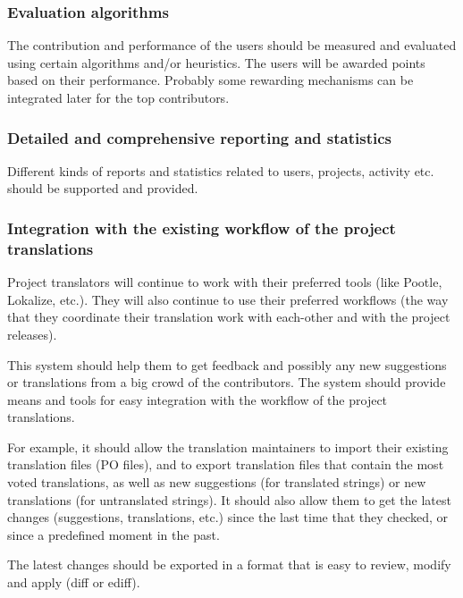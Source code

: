\documentclass[11pt]{article}
\begin{document}
\subsubsection{Evaluation algorithms}
\label{sec-3.1.5}


    The contribution and performance of the users should be measured
    and evaluated using certain algorithms and/or heuristics. The
    users will be awarded points based on their performance. Probably
    some rewarding mechanisms can be integrated later for the top
    contributors.

\subsubsection{Detailed and comprehensive reporting and statistics}
\label{sec-3.1.6}


    Different kinds of reports and statistics related to users,
    projects, activity etc. should be supported and provided.

\subsubsection{Integration with the existing workflow of the project translations}
\label{sec-3.1.7}


    Project translators will continue to work with their preferred
    tools (like Pootle, Lokalize, etc.). They will also continue to
    use their preferred workflows (the way that they coordinate their
    translation work with each-other and with the project releases).

    This system should help them to get feedback and possibly any new
    suggestions or translations from a big crowd of the
    contributors. The system should provide means and tools for easy
    integration with the workflow of the project translations.

    For example, it should allow the translation maintainers to import
    their existing translation files (PO files), and to export
    translation files that contain the most voted translations, as
    well as new suggestions (for translated strings) or new
    translations (for untranslated strings). It should also allow them
    to get the latest changes (suggestions, translations, etc.) since
    the last time that they checked, or since a predefined moment in
    the past.

    The latest changes should be exported in a format that is easy to
    review, modify and apply (diff or ediff).
\end{document}

